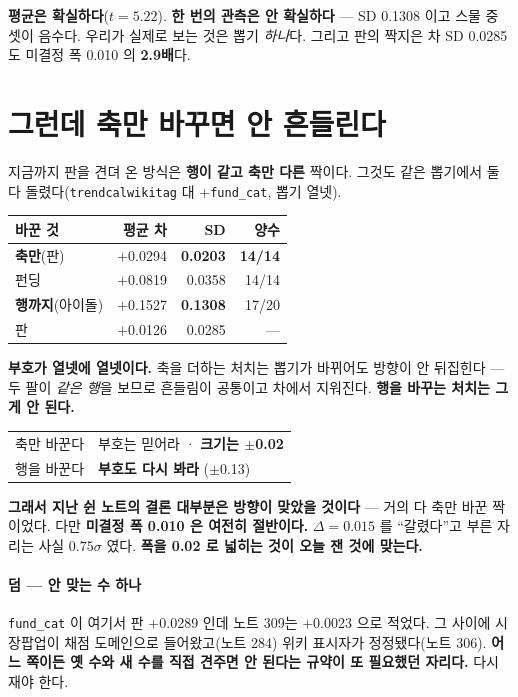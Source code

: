 \documentclass[10pt]{article}
\begin{document}
\textbf{평균은 확실하다}($t{=}5.22$). \textbf{한 번의 관측은 안 확실하다}
--- SD 0.1308 이고 스물 중 셋이 음수다. 우리가 실제로 보는 것은 뽑기
\emph{하나}다. 그리고 판의 짝지은 차 SD 0.0285 도 미결정 폭 0.010 의
\textbf{2.9배}다.

\section{그런데 축만 바꾸면 안 흔들린다}

지금까지 판을 견뎌 온 방식은 \textbf{행이 같고 축만 다른} 짝이다. 그것도
같은 뽑기에서 둘 다 돌렸다(\texttt{trendcalwikitag} 대 $+$\texttt{fund\_cat},
뽑기 열넷).

\begin{center}\footnotesize
\begin{tabular}{lrrr}
\hline
바꾼 것 & 평균 차 & SD & 양수 \\
\hline
\textbf{축만}(판) & $+$0.0294 & \textbf{0.0203} & \textbf{14/14} \\
\quad 펀딩 & $+$0.0819 & 0.0358 & 14/14 \\
\hline
\textbf{행까지}(아이돌) & $+$0.1527 & \textbf{0.1308} & 17/20 \\
\quad 판 & $+$0.0126 & 0.0285 & --- \\
\hline
\end{tabular}
\end{center}

\textbf{부호가 열넷에 열넷이다.} 축을 더하는 처치는 뽑기가 바뀌어도 방향이
안 뒤집힌다 --- 두 팔이 \emph{같은 행}을 보므로 흔들림이 공통이고 차에서
지워진다. \textbf{행을 바꾸는 처치는 그게 안 된다.}

\begin{center}\small
\begin{tabular}{ll}
\hline
축만 바꾼다 & 부호는 믿어라 · \textbf{크기는 $\pm$0.02} \\
행을 바꾼다 & \textbf{부호도 다시 봐라} ($\pm$0.13) \\
\hline
\end{tabular}
\end{center}

\textbf{그래서 지난 쉰 노트의 결론 대부분은 방향이 맞았을 것이다} --- 거의
다 축만 바꾼 짝이었다. 다만 \textbf{미결정 폭 0.010 은 여전히 절반이다.}
$\Delta{=}0.015$ 를 ``갈렸다''고 부른 자리는 사실 $0.75\sigma$ 였다.
\textbf{폭을 0.02 로 넓히는 것이 오늘 잰 것에 맞는다.}

\paragraph{덤 --- 안 맞는 수 하나} \texttt{fund\_cat} 이 여기서 판
$+$0.0289 인데 노트 309는 $+$0.0023 으로 적었다. 그 사이에 시장팝업이
채점 도메인으로 들어왔고(노트 284) 위키 표시자가 정정됐다(노트 306).
\textbf{어느 쪽이든 옛 수와 새 수를 직접 견주면 안 된다는 규약이 또
필요했던 자리다.} 다시 재야 한다.
\end{document}
